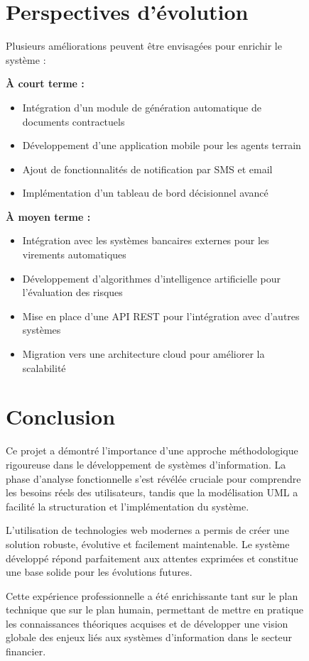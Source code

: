 \documentclass[12pt,a4paper]{report}
\begin{document}
\begin{figure}[H]
\section*{Perspectives d'évolution}

Plusieurs améliorations peuvent être envisagées pour enrichir le système :

\textbf{À court terme :}
\begin{itemize}
    \item Intégration d'un module de génération automatique de documents contractuels
    \item Développement d'une application mobile pour les agents terrain
    \item Ajout de fonctionnalités de notification par SMS et email
    \item Implémentation d'un tableau de bord décisionnel avancé
\end{itemize}

\textbf{À moyen terme :}
\begin{itemize}
    \item Intégration avec les systèmes bancaires externes pour les virements automatiques
    \item Développement d'algorithmes d'intelligence artificielle pour l'évaluation des risques
    \item Mise en place d'une API REST pour l'intégration avec d'autres systèmes
    \item Migration vers une architecture cloud pour améliorer la scalabilité
\end{itemize}

\section*{Conclusion}

Ce projet a démontré l'importance d'une approche méthodologique rigoureuse dans le développement de systèmes d'information. La phase d'analyse fonctionnelle s'est révélée cruciale pour comprendre les besoins réels des utilisateurs, tandis que la modélisation UML a facilité la structuration et l'implémentation du système.

L'utilisation de technologies web modernes a permis de créer une solution robuste, évolutive et facilement maintenable. Le système développé répond parfaitement aux attentes exprimées et constitue une base solide pour les évolutions futures.

Cette expérience professionnelle a été enrichissante tant sur le plan technique que sur le plan humain, permettant de mettre en pratique les connaissances théoriques acquises et de développer une vision globale des enjeux liés aux systèmes d'information dans le secteur financier.


\end{figure}
\end{document}
